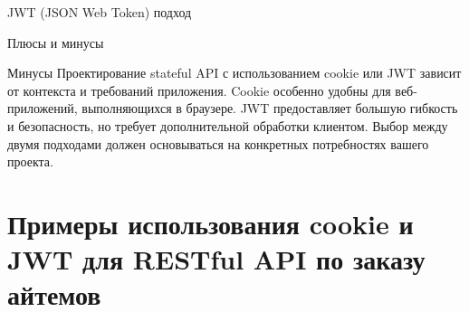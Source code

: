 \documentclass[
  ignorenonframetext,
  aspectratio=169,
  aspectratio=169]{beamer}
\begin{document}
\begin{frame}[fragile]{JWT (JSON Web Token) подход}
\begin{block}{Плюсы и минусы}
\begin{block}{Минусы}
Проектирование stateful API с использованием cookie или JWT зависит от
контекста и требований приложения. Cookie особенно удобны для
веб-приложений, выполняющихся в браузере. JWT предоставляет большую
гибкость и безопасность, но требует дополнительной обработки клиентом.
Выбор между двумя подходами должен основываться на конкретных
потребностях вашего проекта.
\end{block}
\end{block}
\end{frame}

\hypertarget{ux43fux440ux438ux43cux435ux440ux44b-ux438ux441ux43fux43eux43bux44cux437ux43eux432ux430ux43dux438ux44f-cookie-ux438-jwt-ux434ux43bux44f-restful-api-ux43fux43e-ux437ux430ux43aux430ux437ux443-ux430ux439ux442ux435ux43cux43eux432}{%
\section{Примеры использования cookie и JWT для RESTful API по заказу
айтемов}\label{ux43fux440ux438ux43cux435ux440ux44b-ux438ux441ux43fux43eux43bux44cux437ux43eux432ux430ux43dux438ux44f-cookie-ux438-jwt-ux434ux43bux44f-restful-api-ux43fux43e-ux437ux430ux43aux430ux437ux443-ux430ux439ux442ux435ux43cux43eux432}}
\end{document}
